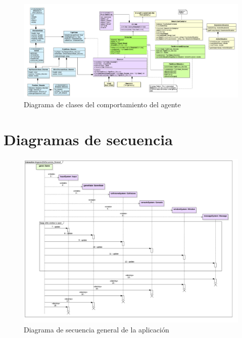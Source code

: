 \clearpage
\begin{landscape}
\begin{figure}
	\begin{adjustwidth}{-3cm}{}
		\includegraphics[width=24cm]{otros/UML/png/alld/png/gamelogic__gameplay__characterAI__diagramaDeClases_IA_5.png}
		\caption{Diagrama de clases del comportamiento del agente}
		\label{class:agent}
	\end{adjustwidth}
\end{figure}
\end{landscape}
\clearpage


\section{Diagramas de secuencia}

\begin{figure}
	\centerline{\includegraphics[width=19cm]{otros/UML/png/alld/png/CasosDeUso__General__Collaboration1__Interaction1__diagramaDeSecuencia_General_15.png}}
	\caption{Diagrama de secuencia general de la aplicación}
	\label{sec:general}
\end{figure}

